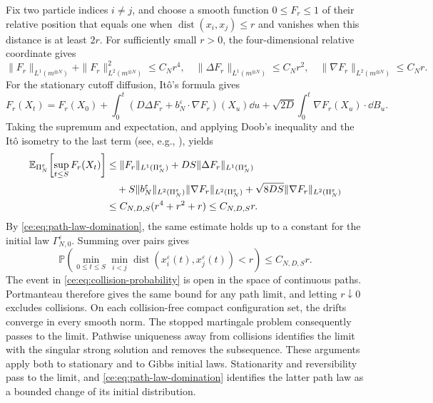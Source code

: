 \documentclass[11pt,reqno]{amsart}
\numberwithin{equation}{section}
\theoremstyle{plain}
\theoremstyle{remark}
\newcommand{\E}{\mathbb E}\newcommand{\Q}{\mathbb Q}\newcommand{\Pb}{\mathbb P}
\begin{document}
Fix two particle indices $i\ne j$, and choose a smooth function $0\le F_r\le1$ of their relative position that equals one when $\operatorname{dist}(x_i,x_j)\le r$ and vanishes when this distance is at least $2r$. For sufficiently small $r>0$, the four-dimensional relative coordinate gives
\begin{equation}\label{ce:eq:collision-cutoff-norms}
 \|F_r\|_{L^1(m^{\otimes N})}+\|F_r\|_{L^2(m^{\otimes N})}^2\le C_Nr^4,
 \quad \|\Delta F_r\|_{L^1(m^{\otimes N})}\le C_Nr^2,
 \quad \|\nabla F_r\|_{L^2(m^{\otimes N})}\le C_Nr.
\end{equation}
For the stationary cutoff diffusion, It\^o's formula gives
\begin{equation}\label{ce:eq:collision-ito}
 F_r(X_t)=F_r(X_0)+\int_0^t(D\Delta F_r+b_N^\varepsilon\cdot\nabla F_r)(X_u)\dd u
 +\sqrt{2D}\int_0^t\nabla F_r(X_u)\cdot\dd B_u.
\end{equation}
Taking the supremum and expectation, and applying Doob's inequality and the It\^o isometry to the last term (see, e.g., \cite[Chapters~II and~IV]{RevuzYor}), yields
\begin{align}
 \E_{\Pi_N^\varepsilon}\!\left[\sup_{t\le S}F_r(X_t)\right]
 &\le\|F_r\|_{L^1(\Pi_N^\varepsilon)}+DS\|\Delta F_r\|_{L^1(\Pi_N^\varepsilon)}\notag\\
 &\quad+S\|b_N^\varepsilon\|_{L^2(\Pi_N^\varepsilon)}\|\nabla F_r\|_{L^2(\Pi_N^\varepsilon)}
 +\sqrt{8DS}\|\nabla F_r\|_{L^2(\Pi_N^\varepsilon)}\notag\\
 &\le C_{N,D,S}(r^4+r^2+r)\le C_{N,D,S}r.\label{ce:eq:capacitybound}
\end{align}
By \eqref{ce:eq:path-law-domination}, the same estimate holds up to a constant for the initial law $\Gamma_{N,0}^\varepsilon$. Summing over pairs gives
\begin{equation}\label{ce:eq:collision-probability}
 \Pb\left(\min_{0\le t\le S}\min_{i<j}\operatorname{dist}(x_i^\varepsilon(t),x_j^\varepsilon(t))<r\right)
 \le C_{N,D,S}r.
\end{equation}
The event in \eqref{ce:eq:collision-probability} is open in the space of continuous paths. Portmanteau therefore gives the same bound for any path limit, and letting $r\downarrow0$ excludes collisions. On each collision-free compact configuration set, the drifts converge in every smooth norm. The stopped martingale problem consequently passes to the limit. Pathwise uniqueness away from collisions identifies the limit with the singular strong solution and removes the subsequence. These arguments apply both to stationary and to Gibbs initial laws. Stationarity and reversibility pass to the limit, and \eqref{ce:eq:path-law-domination} identifies the latter path law as a bounded change of its initial distribution.
\end{document}
